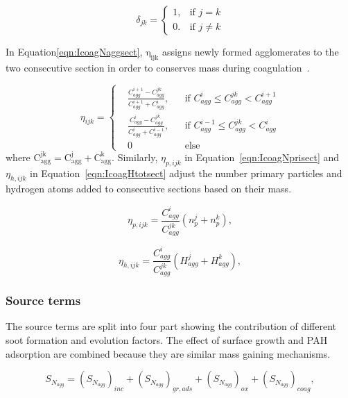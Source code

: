 \begin{equation}
	\delta_{jk}=
	\left\{
	\begin{array}{lr}
		1, & \text{if } j = k\\
		0. & \text{if } j \neq k
	\end{array}
	\right.
	\label{eqn:deltakronecker}
\end{equation}

In Equation\eqref{eqn:IcoagNaggsect}, $\mathrm{\eta_{ijk}}$ assigns newly formed agglomerates to the two consecutive section in order to conserves mass during coagulation~\citep{park2005aerosol}.

\begin{equation}
	\eta_{ijk}=
	\left\{
	\begin{aligned}
	&\frac{C^{i+1}_{agg}-C^{jk}_{agg}}{C^{i+1}_{agg}+C^i_{agg}},
	&&
	\text{if } C^i_{agg} \le C^{jk}_{agg} < C^{i+1}_{agg}
	\\
	&\frac{C^{i}_{agg}-C^{jk}_{agg}}{C^{i}_{agg}+C^{i-1}_{agg}}, 
	&&
	\text{if } C^{i-1}_{agg} \le C^{jk}_{agg} < C^{i}_{agg}
	\\
	&0
	&&\text{else}
	\end{aligned}
	\right.
	\label{eqn:etacoag}
\end{equation}
\noindent where $\mathrm{C^{jk}_{agg}=C^{j}_{agg}+C^{k}_{agg}}$. Similarly, $\eta_{p,ijk}$ in Equation~\eqref{eqn:IcoagNprisect} and $\eta_{h,ijk}$ in Equation~\eqref{eqn:IcoagHtotsect} adjust the number primary particles and hydrogen atoms added to consecutive sections based on their mass.

\begin{equation}
	\eta_{p,ijk}=
	\frac{C^i_{agg}}{C^{jk}_{agg}}
	\left(
		n^j_p + n^k_p
	\right)
	\label{eqn:etapcoag},
\end{equation}

\begin{equation}
	\eta_{h,ijk}=
	\frac{C^i_{agg}}{C^{jk}_{agg}}
	\left(
	H^j_{agg} + H^k_{agg}
	\right)
	\label{eqn:etahcoag},
\end{equation}

\subsubsection{Source terms}
The source terms are split into four part showing the contribution of different soot formation and evolution factors. The effect of surface growth and PAH adsorption are combined because they are similar mass gaining mechanisms.

\begin{equation}
	S_{N_{agg}} = 
	\left(S_{N_{agg}}\right)_{inc}
	+\left(S_{N_{agg}}\right)_{gr, ads}
	+\left(S_{N_{agg}}\right)_{ox}
	+\left(S_{N_{agg}}\right)_{coag}
	\label{eqn:S_Naggsect},
\end{equation}


